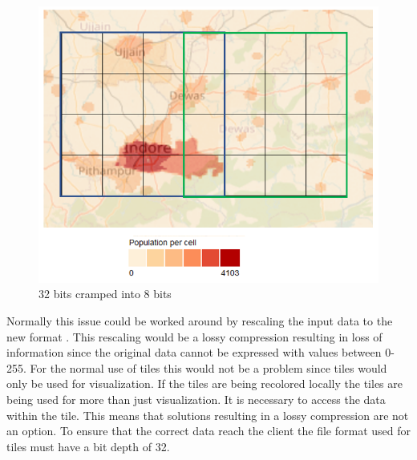 \begin{figure} [H]
	\centering
	\includegraphics[width=.8\textwidth]{Pictures/WhyColorLocallyMap}
	\caption{32 bits cramped into 8 bits}
	\label{WhyColorLocallyMap}
\end{figure}

Normally this issue could be worked around by rescaling the input data to the new format \citep{gdal2tilesDoc} . This rescaling would be a lossy compression resulting in loss of information since the original data cannot be expressed with values between 0-255. \citep{dent}
For the normal use of tiles this would not be a problem since tiles would only be used for visualization. 
If the tiles are being recolored locally the tiles are being used for more than just visualization. It is necessary to access the data within the tile. This means that solutions resulting in a lossy compression are not an option. To ensure that the correct data reach the client the file format used for tiles must have a bit depth of 32. 



